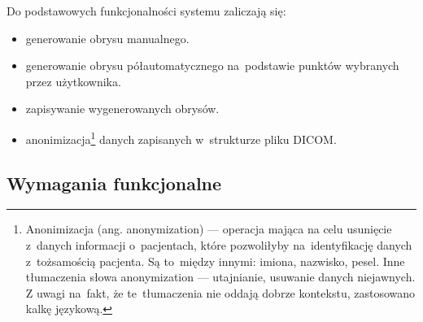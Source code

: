 \documentclass[a4paper,11pt,twoside,openright]{report}
\theoremstyle{definition}
\begin{document}
Do podstawowych funkcjonalności systemu zaliczają się:
\begin{itemize}[noitemsep]
\item generowanie obrysu manualnego.
\item generowanie obrysu półautomatycznego na~podstawie punktów wybranych przez użytkownika.
\item zapisywanie wygenerowanych obrysów.
\item anonimizacja\footnote {Anonimizacja (ang. anonymization) --- operacja mająca
na celu usunięcie z~danych informacji o~pacjentach, które pozwoliłyby na~identyfikację
danych z~tożsamością pacjenta. Są to~między innymi: imiona, nazwisko, pesel.
Inne tłumaczenia słowa anonymization --- utajnianie, usuwanie danych niejawnych.
Z uwagi na~fakt, że te~tłumaczenia nie oddają dobrze kontekstu, zastosowano kalkę
językową.} danych zapisanych w~strukturze pliku DICOM.
\end{itemize}

\subsection {Wymagania funkcjonalne}
\end{document}

